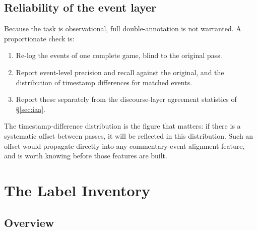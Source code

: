 \subsection{Reliability of the event layer}
\label{sec:events-reliability}

Because the task is observational, full double-annotation is not warranted. A
proportionate check is:

\begin{enumerate}
  \item Re-log the events of one complete game, blind to the original pass.
  \item Report event-level precision and recall against the original, and the
    distribution of timestamp differences for matched events.
  \item Report these separately from the discourse-layer agreement statistics
    of \S\ref{sec:iaa}.
\end{enumerate}

\noindent The timestamp-difference distribution is the figure that matters: if there is a systematic offset between passes, it will be reflected in this distribution. Such an offset would propagate directly into any commentary-event alignment feature, and is worth knowing before those features are built.

\section{The Label Inventory}
\label{sec:inventory}

\subsection{Overview}

